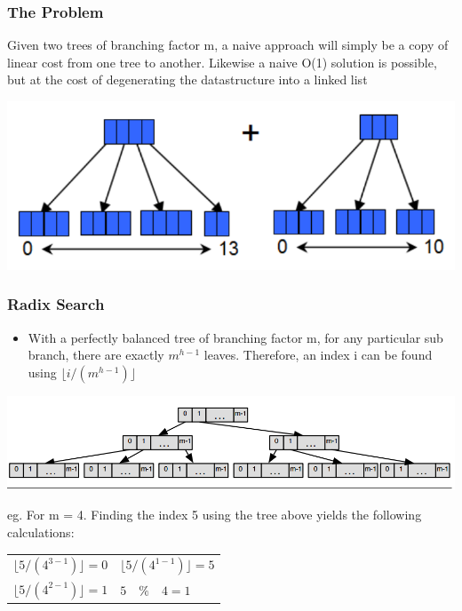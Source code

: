 \documentclass{beamer}
\begin{document}
\begin{frame}
\frametitle{The Problem}

Given two trees of branching factor m, a naive approach will simply be a copy of linear cost from one tree to another. Likewise a naive O(1) solution is possible, but at the cost of degenerating the datastructure into a linked list

	\begin{center}
	
	\includegraphics[scale=0.3]{joinvectors.png}
	
	\end{center}

\end{frame}


\begin{frame}
\frametitle{Radix Search}

	\begin{itemize}
	
		\item With a perfectly balanced tree of branching factor m, for any particular sub branch, there are exactly $m^{h-1}$  leaves. Therefore, an index i can be found using $\lfloor i / (m^{h-1}) \rfloor$ 
	\end{itemize}
	\begin{center}
	
	\includegraphics[scale=0.25]{radixbalancedtree.png}
	
	\end{center}
	
	eg. For m = 4. Finding the index 5 using the tree above yields the following calculations:
	\begin{tabular}{l l}
	
	$\lfloor 5 / (4^{3-1}) \rfloor = 0$ & $ \lfloor 5 / (4^{1-1}) \rfloor = 5 $ \\
	$\lfloor 5 / (4^{2-1}) \rfloor = 1$ & $ 5 \quad \% \quad 4 = 1 $ \\
	
	\end{tabular}		

\end{frame}
\end{document}
